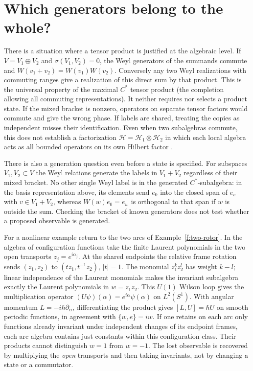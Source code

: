 \section{Which generators belong to the whole?}
There is a situation where a tensor product is justified at the algebraic level. If $V=V_1\oplus V_2$ and $\sigma(V_1,V_2)=0$, the Weyl generators of the summands commute and $W(v_1+v_2)=W(v_1)W(v_2)$. Conversely any two Weyl realizations with commuting ranges give a realization of this direct sum by that product. This is the universal property of the maximal $C^*$ tensor product (the completion allowing all commuting representations). It neither requires nor selects a product state. If the mixed bracket is nonzero, operators on separate tensor factors would commute and give the wrong phase. If labels are shared, treating the copies as independent misses their identification. Even when two subalgebras commute, this does not establish a factorization $\mathcal H=\mathcal H_1\otimes\mathcal H_2$ in which each local algebra acts as all bounded operators on its own Hilbert factor \cite{Haag}.

There is also a generation question even before a state is specified. For subspaces $V_1,V_2\subset V$ the Weyl relations generate the labels in $V_1+V_2$ regardless of their mixed bracket. No other single Weyl label is in the generated $C^*$-subalgebra: in the basis representation above, its elements send $e_0$ into the closed span of $e_v$ with $v\in V_1+V_2$, whereas $W(w)e_0=e_w$ is orthogonal to that span if $w$ is outside the sum. Checking the bracket of known generators does not test whether a proposed observable is generated.

For a nonlinear example return to the two arcs of Example~\ref{f:two-rotor}. In the algebra of configuration functions take the finite Laurent polynomials in the two open transports $z_j=e^{i\alpha_j}$. At the shared endpoints the relative frame rotation sends $(z_1,z_2)$ to $(tz_1,t^{-1}z_2)$, $|t|=1$. The monomial $z_1^k z_2^l$ has weight $k-l$; linear independence of the Laurent monomials makes the invariant subalgebra exactly the Laurent polynomials in $w=z_1z_2$. This $U(1)$ Wilson loop gives the multiplication operator $(U\psi)(\alpha)=e^{i\alpha}\psi(\alpha)$ on $L^2(S^1)$. With angular momentum $L=-i\hbar\partial_\alpha$, differentiating the product gives $[L,U]=\hbar U$ on smooth periodic functions, in agreement with $\{w,e\}=iw$. If one retains on each arc only functions already invariant under independent changes of its endpoint frames, each arc algebra contains just constants within this configuration class. Their products cannot distinguish $w=1$ from $w=-1$. The lost observable is recovered by multiplying the \emph{open} transports and then taking invariants, not by changing a state or a commutator.

